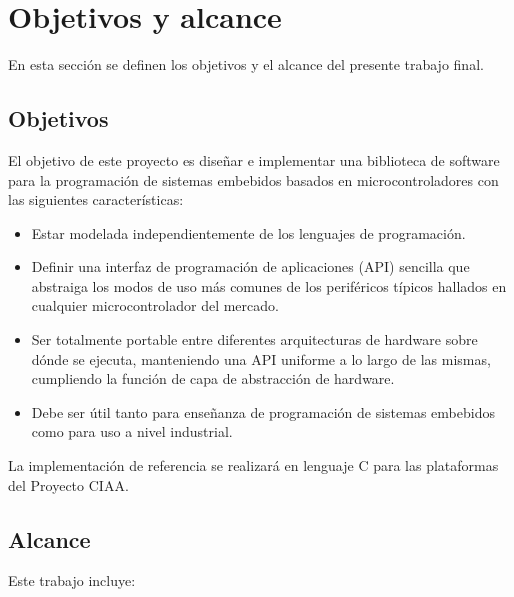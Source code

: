 \section{Objetivos y alcance}
\label{sec:objetivosAlance}

En esta sección se definen los objetivos y el alcance del presente trabajo final.

\subsection{Objetivos}
\label{subsec:objetivos}

El objetivo de este proyecto es diseñar e implementar una biblioteca de software para la programación de sistemas embebidos basados en microcontroladores con las siguientes características: 

\begin{itemize}
\item
Estar modelada independientemente de los lenguajes de programación.
\item
Definir una interfaz de programación de aplicaciones (API) sencilla que abstraiga los modos de uso más comunes de los periféricos típicos hallados en cualquier microcontrolador del mercado. 
\item
Ser totalmente portable entre diferentes arquitecturas de hardware sobre dónde se ejecuta, manteniendo una API uniforme a lo largo de las mismas, cumpliendo la función de capa de abstracción de hardware.
\item
Debe ser útil tanto para enseñanza de programación de sistemas embebidos como para uso a nivel industrial.
\end{itemize}

La implementación de referencia se realizará en lenguaje C para las plataformas del Proyecto CIAA.

\subsection{Alcance}
\label{subsec:alcance}

Este trabajo incluye:

